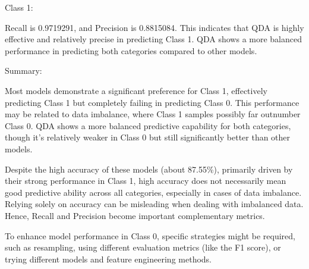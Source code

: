 \documentclass[
]{article}
\begin{document}
Class 1:

Recall is 0.9719291, and Precision is 0.8815084. This indicates that QDA
is highly effective and relatively precise in predicting Class 1. QDA
shows a more balanced performance in predicting both categories compared
to other models.

Summary:

Most models demonstrate a significant preference for Class 1,
effectively predicting Class 1 but completely failing in predicting
Class 0. This performance may be related to data imbalance, where Class
1 samples possibly far outnumber Class 0. QDA shows a more balanced
predictive capability for both categories, though it's relatively weaker
in Class 0 but still significantly better than other models.

Despite the high accuracy of these models (about 87.55\%), primarily
driven by their strong performance in Class 1, high accuracy does not
necessarily mean good predictive ability across all categories,
especially in cases of data imbalance. Relying solely on accuracy can be
misleading when dealing with imbalanced data. Hence, Recall and
Precision become important complementary metrics.

To enhance model performance in Class 0, specific strategies might be
required, such as resampling, using different evaluation metrics (like
the F1 score), or trying different models and feature engineering
methods.
\end{document}

